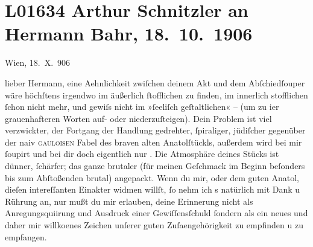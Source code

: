 

\section[Arthur Schnitzler an Hermann Bahr, 18. 10. 1906]{L01634 Arthur Schnitzler an Hermann Bahr, 18. 10. 1906 }
\nopagebreak{}
\rehead{ }\normalsize\beginnumbering{}
\toendnotes[C]{\smallbreak\pagebreak[2]}
\toendnotes[C]{\smallbreak}
\pstart
           \raggedleft{}{\pb}Wien, 18. X. 906\pend
           
\pstart{}lieber Hermann, \pend\vspace{0.5em}
\pstart
           eine Aehnlichkeit zwiſchen deinem
                  Akt und dem Abſchiedſouper wäre
               höchſtens irgendwo im äußerlich ſtofflichen zu finden, im innerlich stofflichen ſchon
               nicht mehr, und gewiſs nicht im  »ſeeliſch
               geſtaltlichen« – \introOben{}(\introOben{}um zu i{\geminationm}er
               grauenhafteren Worten auf- oder niederzuſteigen). Dein Problem ist viel verzwickter,
               der Fortgang der Handlung gedrehter, ſpiraliger, jüdiſcher gegenüber der naiv \textsc{gauloisen} Fabel des braven alten Anatolſtückls, außerdem wird bei mir ſoupirt und bei dir doch eigentlich nur
               \label{K_L01634-1v}\label{K_L01634-1}. Die Atmosphäre
               deines Stücks ist dünner, ſchärfer; das ganze brutaler (für {\pb}meinen Geſchmack im
               Beginn beſonders bis zum Abſtoßenden brutal) angepackt. Wenn du mir, oder dem guten
                  Anatol, dieſen intereſſanten Einakter widmen
               willſt, ſo nehm ich s natürlich mit Dank u Rührung an, nur mußt du mir erlauben,
               deine Erinnerung nicht als Anregungsquiirung und Ausdruck einer Gewiſſensſchuld ſondern als ein neues und daher mir
                  willko{\geminationm}enes Zeichen unſerer guten Zuſa{\geminationm}engehörigkeit zu empfinden u zu empfangen.\pend
           

